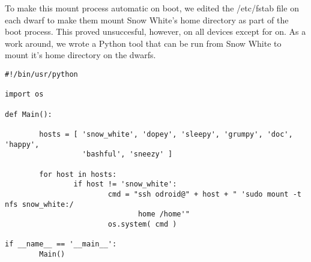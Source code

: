 To make this mount process automatic on boot, we edited the /etc/fstab file on each dwarf to make them mount Snow White's home directory as part of the boot process. This proved unsuccesful, however, on all devices except for on. As a work around, we wrote a Python tool that can be run from Snow White to mount it's home directory on the dwarfs.


\begin{lstlisting}
#!/bin/usr/python

import os

def Main():

        hosts = [ 'snow_white', 'dopey', 'sleepy', 'grumpy', 'doc', 'happy',
 				  'bashful', 'sneezy' ]

        for host in hosts:
                if host != 'snow_white':
                        cmd = "ssh odroid@" + host + " 'sudo mount -t nfs snow_white:/
							   home /home'"
                        os.system( cmd )

if __name__ == '__main__':
        Main()
\end{lstlisting}	
